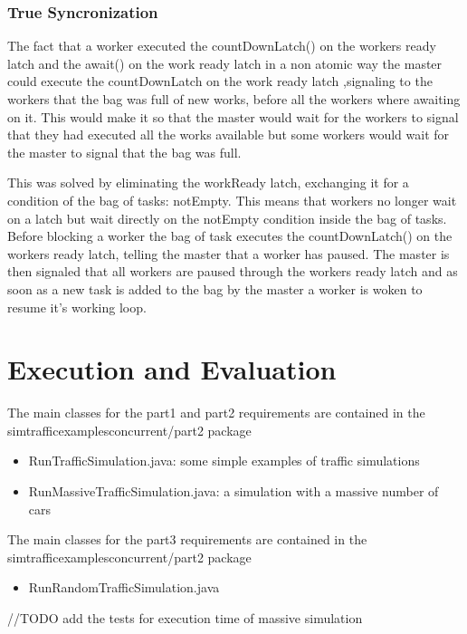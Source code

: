 \documentclass[12pt, a4paper]{report}
\begin{document}
\subsection{True Syncronization}
The fact that a worker executed the countDownLatch() on the workers
 ready latch and the await() on the work ready latch in a non atomic way
 the master could execute the countDownLatch on the work ready latch ,signaling
 to the workers that the bag was full of new works, before
 all the workers where awaiting on it. This would make it so that the master would
 wait for the workers to signal that they had executed all the works available but
 some workers would wait for the master to signal that the bag was full.

This was solved by eliminating the workReady latch, exchanging it for a condition
 of the bag of tasks: notEmpty. This means that workers no longer wait on a latch
 but wait directly on the notEmpty condition inside the bag of tasks. Before blocking
 a worker the bag of task executes the countDownLatch() on the workers ready latch,
 telling the master that a worker has paused. The master is then signaled that all
 workers are paused through the workers ready latch and as soon as a new task is added
 to the bag by the master a worker is woken to resume it's working loop.

\chapter{Execution and Evaluation}
The main classes for the part1 and part2 requirements are contained in the simtrafficexamplesconcurrent/part2 package
\begin{itemize}
    \item RunTrafficSimulation.java: some simple examples of traffic simulations
    \item RunMassiveTrafficSimulation.java: a simulation with a massive number of cars
\end{itemize}

The main classes for the part3 requirements are contained in the simtrafficexamplesconcurrent/part2 package
\begin{itemize}
    \item RunRandomTrafficSimulation.java
\end{itemize}

//TODO add the tests for execution time of massive simulation


\end{document}
